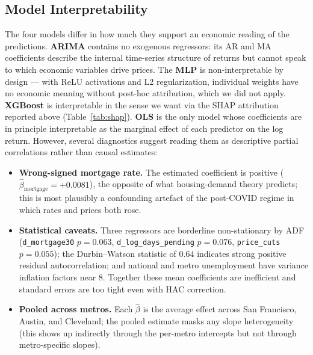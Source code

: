 \subsection{Model Interpretability}

The four models differ in how much they support an economic reading of the predictions. \textbf{ARIMA} contains no exogenous regressors: its AR and MA coefficients describe the internal time-series structure of returns but cannot speak to which economic variables drive prices. The \textbf{MLP} is non-interpretable by design --- with ReLU activations and L2 regularization, individual weights have no economic meaning without post-hoc attribution, which we did not apply. \textbf{XGBoost} is interpretable in the sense we want via the SHAP attribution reported above (Table~\ref{tab:shap}). \textbf{OLS} is the only model whose coefficients are in principle interpretable as the marginal effect of each predictor on the log return. However, several diagnostics suggest reading them as descriptive partial correlations rather than causal estimates:

\begin{itemize}
    \item \textbf{Wrong-signed mortgage rate.} The estimated coefficient is positive ($\hat{\beta}_{\text{mortgage}} = +0.0081$), the opposite of what housing-demand theory predicts; this is most plausibly a confounding artefact of the post-COVID regime in which rates and prices both rose.
    \item \textbf{Statistical caveats.} Three regressors are borderline non-stationary by ADF (\texttt{d\_mortgage30} $p=0.063$, \texttt{d\_log\_days\_pending} $p=0.076$, \texttt{price\_cuts} $p=0.055$); the Durbin--Watson statistic of $0.64$ indicates strong positive residual autocorrelation; and national and metro unemployment have variance inflation factors near 8. Together these mean coefficients are inefficient and standard errors are too tight even with HAC correction.
    \item \textbf{Pooled across metros.} Each $\hat{\beta}$ is the average effect across San Francisco, Austin, and Cleveland; the pooled estimate masks any slope heterogeneity (this shows up indirectly through the per-metro intercepts but not through metro-specific slopes).
\end{itemize}
